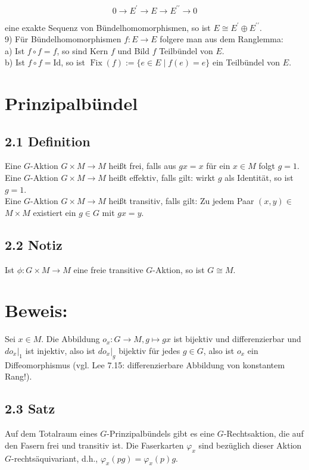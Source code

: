 $$
0 \rightarrow E^{\prime} \rightarrow E \rightarrow E^{\prime \prime} \rightarrow 0
$$

eine exakte Sequenz von Bündelhomomorphismen, so ist $E \cong E^{\prime} \oplus E^{\prime \prime}$.\\
9) Für Bündelhomomorphismen $f: E \rightarrow E$ folgere man aus dem Ranglemma:\\
a) Ist $f \circ f=f$, so sind Kern $f$ und Bild $f$ Teilbündel von $E$.\\
b) Ist $f \circ f=\mathrm{Id}$, so ist $\operatorname{Fix}(f):=\{e \in E \mid f(e)=e\}$ ein Teilbündel von $E$.



\pagebreak

\section{Prinzipalbündel}
\subsection*{2.1 Definition}
Eine $G$-Aktion $G \times M \rightarrow M$ heißt frei, falls aus $g x=x$ für ein $x \in M$ folgt $g=1$.\\
Eine $G$-Aktion $G \times M \rightarrow M$ heißt effektiv, falls gilt: wirkt $g$ als Identität, so ist $g=1$.\\
Eine $G$-Aktion $G \times M \rightarrow M$ heißt transitiv, falls gilt: Zu jedem Paar $(x, y) \in$ $M \times M$ existiert ein $g \in G$ mit $g x=y$.

\subsection*{2.2 Notiz}
Ist $\phi: G \times M \rightarrow M$ eine freie transitive $G$-Aktion, so ist $G \cong M$.

\section*{Beweis:}
Sei $x \in M$. Die Abbildung $o_{x}: G \rightarrow M, g \mapsto g x$ ist bijektiv und differenzierbar und $\left.d o_{x}\right|_{1}$ ist injektiv, also ist $\left.d o_{x}\right|_{g}$ bijektiv für jedes $g \in G$, also ist $o_{x}$ ein Diffeomorphismus (vgl. Lee 7.15: differenzierbare Abbildung von konstantem Rang!).

\subsection*{2.3 Satz}
Auf dem Totalraum eines $G$-Prinzipalbündels gibt es eine $G$-Rechtsaktion, die auf den Fasern frei und transitiv ist. Die Faserkarten $\varphi_{x}$ sind bezüglich dieser Aktion $G$-rechtsäquivariant, d.h., $\varphi_{x}(p g)=\varphi_{x}(p) g$.

